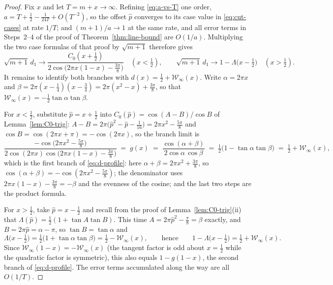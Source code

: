 \documentclass[11pt]{article}
\theoremstyle{definition}
\begin{document}
\begin{proof}
Fix $x$ and let $T=m+x\to\infty$. Refining \eqref{eq:a-vs-T} one order,
$a=T+\tfrac12-\tfrac1{24T}+O(T^{-2})$, so the offset $\hat p$ converges
to its case value in \eqref{eq:cut-cases} at rate $1/T$; and
$(m+1)/a\to1$ at the same rate, and all error terms in Steps~2--4 of the
proof of Theorem~\ref{thm:line-bound} are $O(1/a)$. Multiplying the two
case formulas of that proof by $\sqrt{m+1}$ therefore gives
\[
\sqrt{m+1}\,d_1\longrightarrow
\frac{C_0(x+\tfrac12)}{2\cos\bigl(2\pi x(1-x)-\tfrac{3\pi}8\bigr)}
\quad(x<\tfrac12),
\qquad
\sqrt{m+1}\,d_1\longrightarrow 1-\Lambda\bigl(x-\tfrac12\bigr)
\quad(x>\tfrac12).
\]
It remains to identify both branches with
$d(x)=\tfrac12+\mathcal W_{\infty}(x)$. Write $\alpha=2\pi x$ and
$\beta=2\pi(x-\tfrac14)(x-\tfrac34)=2\pi(x^{2}-x)+\tfrac{3\pi}8$, so that
$\mathcal W_{\infty}(x)=-\tfrac12\tan\alpha\tan\beta$.

For $x<\tfrac12$, substitute $\hat p=x+\tfrac12$ into
$C_0(\hat p)=\cos(A-B)/\cos B$ of Lemma~\ref{lem:C0-trig}:
$A-B=2\pi\bigl(\hat p^{2}-\hat p-\tfrac1{16}\bigr)=2\pi x^{2}-\tfrac{5\pi}8$
and $\cos B=\cos(2\pi x+\pi)=-\cos(2\pi x)$, so the branch limit is
\[
\frac{-\cos\bigl(2\pi x^{2}-\tfrac{5\pi}8\bigr)}
{2\cos(2\pi x)\cos\bigl(2\pi x(1-x)-\tfrac{3\pi}8\bigr)}
\;=\;g(x)
\;=\;
\frac{\cos(\alpha+\beta)}{2\cos\alpha\,\cos\beta}
\;=\;\tfrac12\bigl(1-\tan\alpha\tan\beta\bigr)
\;=\;\tfrac12+\mathcal W_{\infty}(x),
\]
which is the first branch of \eqref{eq:d-profile}: here
$\alpha+\beta=2\pi x^{2}+\tfrac{3\pi}8$, so
$\cos(\alpha+\beta)=-\cos(2\pi x^{2}-\tfrac{5\pi}8)$; the denominator uses
$2\pi x(1-x)-\tfrac{3\pi}8=-\beta$ and the evenness of the cosine; and the
last two steps are the product formula.

For $x>\tfrac12$, take $\hat p=x-\tfrac12$ and recall from the proof of
Lemma~\ref{lem:C0-trig}(ii) that
$\Lambda(\hat p)=\tfrac12(1+\tan A\tan B)$. This time
$A=2\pi\hat p^{2}-\tfrac\pi8=\beta$ exactly, and $B=2\pi\hat p=\alpha-\pi$,
so $\tan B=\tan\alpha$ and
\[
\Lambda\bigl(x-\tfrac12\bigr)
=\tfrac12\bigl(1+\tan\alpha\tan\beta\bigr)
=\tfrac12-\mathcal W_{\infty}(x),
\qquad\text{hence}\qquad
1-\Lambda\bigl(x-\tfrac12\bigr)=\tfrac12+\mathcal W_{\infty}(x).
\]
Since $\mathcal W_{\infty}(1-x)=-\mathcal W_{\infty}(x)$ (the tangent
factor is odd about $x=\tfrac12$ while the quadratic factor is symmetric),
this also equals $1-g(1-x)$, the second branch of \eqref{eq:d-profile}.
The error terms accumulated along the way are all $O(1/T)$.
\end{proof}
\end{document}
